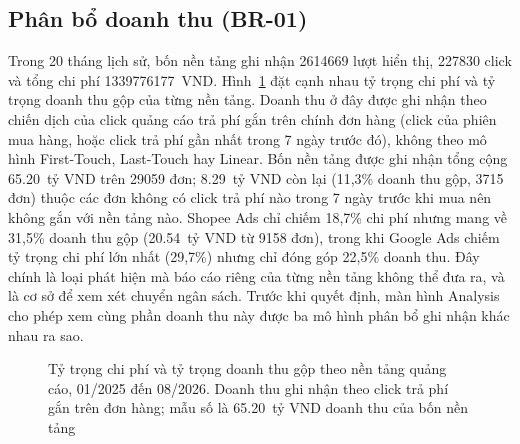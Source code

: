 \subsection{Phân bổ doanh thu (BR-01)}
\label{sec:c4-br01}
Trong 20 tháng lịch sử, bốn nền tảng ghi nhận \num{2614669} lượt hiển thị, \num{227830} click và tổng chi phí \num{1339776177}~VND. Hình~\ref{fig:channels} đặt cạnh nhau tỷ trọng chi phí và tỷ trọng doanh thu gộp của từng nền tảng. Doanh thu ở đây được ghi nhận theo chiến dịch của click quảng cáo trả phí gắn trên chính đơn hàng (click của phiên mua hàng, hoặc click trả phí gần nhất trong 7 ngày trước đó), không theo mô hình First-Touch, Last-Touch hay Linear. Bốn nền tảng được ghi nhận tổng cộng \num{65,20}~tỷ VND trên \num{29059} đơn; \num{8,29}~tỷ VND còn lại (11,3\% doanh thu gộp, \num{3715} đơn) thuộc các đơn không có click trả phí nào trong 7 ngày trước khi mua nên không gắn với nền tảng nào. Shopee Ads chỉ chiếm 18,7\% chi phí nhưng mang về 31,5\% doanh thu gộp (\num{20,54}~tỷ VND từ \num{9158} đơn), trong khi Google Ads chiếm tỷ trọng chi phí lớn nhất (29,7\%) nhưng chỉ đóng góp 22,5\% doanh thu. Đây chính là loại phát hiện mà báo cáo riêng của từng nền tảng không thể đưa ra, và là cơ sở để \shCMO{} xem xét chuyển ngân sách. Trước khi quyết định, màn hình Analysis cho phép xem cùng phần doanh thu này được ba mô hình phân bổ ghi nhận khác nhau ra sao.

\begin{figure}[H]
\centering
{}
\caption[Tỷ trọng chi phí và tỷ trọng doanh thu gộp theo nền tảng quảng cáo]{Tỷ trọng chi phí và tỷ trọng doanh thu gộp theo nền tảng quảng cáo, 01/2025 đến 08/2026. Doanh thu ghi nhận theo click trả phí gắn trên đơn hàng; mẫu số là \num{65,20}~tỷ VND doanh thu của bốn nền tảng}
\label{fig:channels}
\end{figure}

